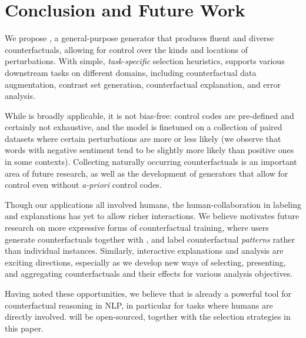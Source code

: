 \section{Conclusion and Future Work}
\label{sec:discuss}

We propose \sysname, a general-purpose generator that produces fluent and diverse counterfactuals, allowing for control over the kinds and locations of perturbations. 
With simple, \emph{task-specific} selection heuristics, \sysname supports various downstream tasks on different domains, including counterfactual data augmentation, contrast set generation, counterfactual explanation, and error analysis.

While \sysname is broadly applicable, it is not bias-free: control codes are pre-defined and certainly not exhaustive, and the model is finetuned on a collection of paired datasets where certain perturbations are more or less likely (\eg we observe that words with negative sentiment tend to be slightly more likely than positive ones in some contexts). 
Collecting naturally occurring counterfactuals is an important area of future research, as well as the development of generators that allow for control even without \emph{a-priori} control codes.

Though our applications all involved humans, the human-\sysname collaboration in labeling and explanations has yet to allow richer interactions. 
We believe \sysname motivates future research on more expressive forms of counterfactual training, where users generate counterfactuals together with \sysname, and label counterfactual \emph{patterns} rather than individual instances. 
Similarly, interactive explanations and analysis are exciting directions, especially as we develop new ways of selecting, presenting, and aggregating counterfactuals and their effects for various analysis objectives.

Having noted these opportunities, we believe that \sysname is already a powerful tool for counterfactual reasoning in NLP, in particular for tasks where humans are directly involved. 
\sysname will be open-sourced, together with the selection strategies in this paper.


